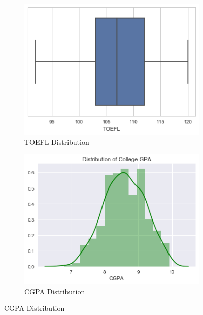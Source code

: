 \documentclass[12pt]{article}
\begin{document}
\begin{sloppypar}
 \begin{figure}[H]
 \centering
  \begin{subfigure}[b]{0.45\textwidth}
    \includegraphics[width=\textwidth]{TOEFL.png}
    \caption{TOEFL Distribution}
    \label{fig:1}
  \end{subfigure}
  \begin{subfigure}[b]{0.45\textwidth}
    \includegraphics[width=\textwidth]{CGPA.png}
    \caption{CGPA Distribution}
    \label{fig:2}
  \end{subfigure}
\end{figure}
 






\end{sloppypar}
\end{document}
